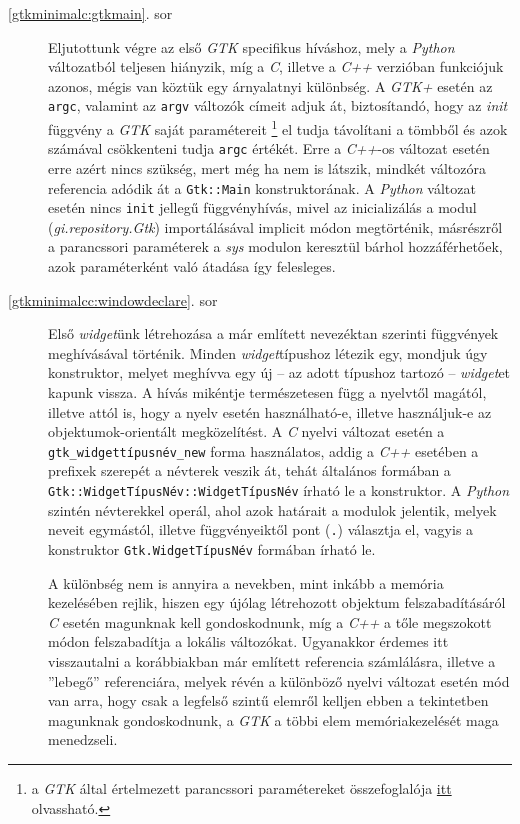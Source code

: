 \begin{description}
 \item[\ref{gtkminimalc:gtkmain}. sor] Eljutottunk végre az első \textit{GTK} specifikus híváshoz, mely a \textit{Python} változatból teljesen hiányzik, míg a \textit{C}, illetve a \textit{C++} verzióban funkciójuk azonos, mégis van köztük egy árnyalatnyi különbség. A \textit{GTK+} esetén az \texttt{argc}, valamint az \texttt{argv} változók címeit adjuk át, biztosítandó, hogy az \textit{init} függvény a \textit{GTK} saját paramétereit \footnote{a \textit{GTK} által értelmezett parancssori paramétereket összefoglalója \href{http://library.gnome.org/devel/gtk/stable/gtk-running.html}{itt} olvassható.} el tudja távolítani a tömbből és azok számával csökkenteni tudja \texttt{argc} értékét. Erre a \textit{C++}-os változat esetén erre azért nincs szükség, mert még ha nem is látszik, mindkét változóra referencia adódik át a \texttt{Gtk::Main} konstruktorának. A \textit{Python} változat esetén nincs \texttt{init} jellegű függvényhívás, mivel az inicializálás a modul (\textit{gi.repository.Gtk}) importálásával implicit módon megtörténik, másrészről a parancssori paraméterek a \textit{sys} modulon keresztül bárhol hozzáférhetőek, azok paraméterként való átadása így felesleges.

 \item[\ref{gtkminimalcc:windowdeclare}. sor] Első \textit{widget}ünk létrehozása a már említett nevezéktan szerinti függvények meghívásával történik. Minden \textit{widget}típushoz létezik egy, mondjuk úgy konstruktor, melyet meghívva egy új -- az adott típushoz tartozó -- \textit{widget}et kapunk vissza. A hívás mikéntje természetesen függ a nyelvtől magától, illetve attól is, hogy a nyelv esetén használható-e, illetve használjuk-e az objektumok-orientált megközelítést. A \textit{C} nyelvi változat esetén a \texttt{gtk\_widgettípusnév\_new} forma használatos, addig a \textit{C++} esetében a prefixek szerepét a névterek veszik át, tehát általános formában a \texttt{Gtk::WidgetTípusNév::WidgetTípusNév} írható le a konstruktor. A \textit{Python} szintén névterekkel operál, ahol azok határait a modulok jelentik, melyek neveit egymástól, illetve függvényeiktől pont (\texttt{.}) választja el, vagyis a konstruktor \texttt{Gtk.WidgetTípusNév} formában írható le.

 A különbség nem is annyira a nevekben, mint inkább a memória kezelésében rejlik, hiszen egy újólag létrehozott objektum felszabadításáról \textit{C} esetén magunknak kell gondoskodnunk, míg a \textit{C++} a tőle megszokott módon felszabadítja a lokális változókat. Ugyanakkor érdemes itt visszautalni a korábbiakban már említett referencia számlálásra, illetve a ''lebegő'' referenciára, melyek révén a különböző nyelvi változat esetén mód van arra, hogy csak a legfelső szintű elemről kelljen ebben a tekintetben magunknak gondoskodnunk, a \textit{GTK} a többi elem memóriakezelését maga menedzseli.


\end{description}
